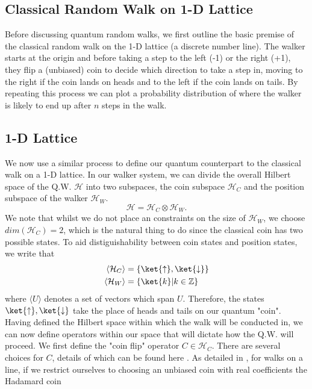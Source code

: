 \subsection{Classical Random Walk on 1-D Lattice}
Before discussing quantum random walks, we first outline the basic premise of the classical random walk on the 1-D lattice (a discrete number line).
The walker starts at the origin and before taking a step to the left (-1) or the right (+1), they flip a (unbiased) coin to decide which direction to take a step in, moving to the right if the coin lands on heads and to the left if the coin lands on tails. 
By repeating this process we can plot a probability distribution of where the walker is likely to end up after $n$ steps in the walk.
\subsection{1-D Lattice}
We now use a similar process to define our quantum counterpart to the classical walk on a 1-D lattice. 
In our walker system, we can divide the overall Hilbert space of the Q.W. $\mathcal{H}$ into two subspaces, the coin subspace $\mathcal{H}_C$ and the position subspace of the walker $\mathcal{H}_W$. 
\begin{equation}
    \mathcal{H} = \mathcal{H}_C \otimes \mathcal{H}_W.
\end{equation}
We note that whilst we do not place an constraints on the size of $\mathcal{H}_W$, we choose $dim(\mathcal{H}_C) = 2$, which is the natural thing to do since the classical coin has two possible states. 
To aid distiguishability between coin states and position states, we write that
\begin{align}
    \langle\mathcal{H}_C\rangle &= \{\ket{\uparrow}, \ket{\downarrow}\}\\
    \langle\mathcal{H}_W\rangle &= \{\ket{k} | k\in\mathbb{Z}\}
\end{align}
where $\langle U \rangle$ denotes a set of vectors which span $U$. 
Therefore, the states $\ket{\uparrow}, \ket{\downarrow}$ take the place of heads and tails on our quantum "coin". 
Having defined the Hilbert space within which the walk will be conducted in, we can now define operators within our space that will dictate how the Q.W. will proceed. We first define the "coin flip" operator $C\in \mathcal{H}_C$. 
There are several choices for $C$, details of which can be found here \cite{Tregenna2003}. 
As detailed in \cite{Tregenna2003}, for walks on a line, if we restrict ourselves to choosing an unbiased coin with real coefficients the Hadamard coin
